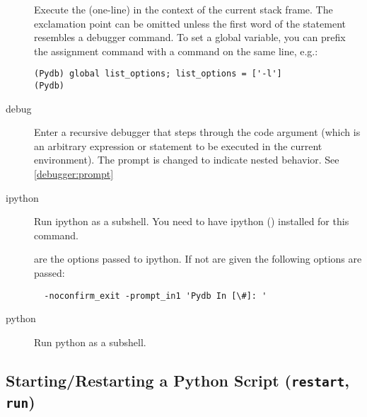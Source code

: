 \begin{description}

\item[\optional{!}]

Execute the (one-line)  in the context of
the current stack frame.
The exclamation point can be omitted unless the first word
of the statement resembles a debugger command.
To set a global variable, you can prefix the assignment
command with a  command on the same line, e.g.:

\begin{verbatim}
(Pydb) global list_options; list_options = ['-l']
(Pydb)
\end{verbatim}

\item[debug ]

Enter a recursive debugger that steps through the code argument (which
is an arbitrary expression or statement to be executed in the current
environment). The prompt is changed to indicate nested behavior. See
\ref{debugger:prompt}

\item[ipython ]\label{command:ipython}

  Run ipython as a subshell. You need to have ipython
  () installed
  for this command.

   are the options passed to ipython. If not are given
  the following options are passed: 
\begin{verbatim}
  -noconfirm_exit -prompt_in1 'Pydb In [\#]: '
\end{verbatim}

\item[python]\label{command:python}

Run python as a subshell.

\end{description}

\subsection{Starting/Restarting a Python Script ({\tt restart}, {\tt run})\label{subsection-restart}}

